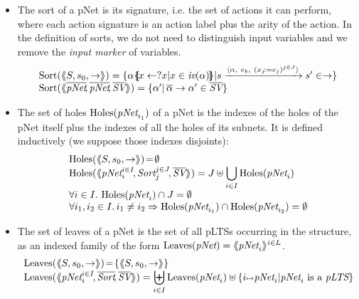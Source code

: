 \documentclass{lncs/llncs}
\begin{document}
\begin{definition}\label{def-sortholeleave}
  \begin{itemize}
  \item The sort of a pNet is its signature, i.e. the set of actions it can
perform, where each action signature is an action 
label plus the arity of the action. In the definition of sorts, we do not need to 
distinguish
input variables and we remove the
\emph{input marker} of variables.
\[
\begin{array}{l}
\Sortop(\mylangle S,s_0, \to\myrangle) = \{\alpha\subst{x \gets ?x| 
x\in\symb{iv}(\alpha)}|s \xrightarrow{\langle \alpha,~e_b,~(x_j\!:= {e}_j)^{j\in
    J}\rangle} s'\in \to \} \\
\Sortop(\mylangle \overline{\pNet}\!, %
\overline{\pNet}\!,
\overline{\symb{SV}}\myrangle)
=\{\alpha' |\, \overline{\alpha}%
\to\alpha'\in\set{\symb{SV}}\}
\end{array}
\]

\item
The set of holes $\Holes(\pNet_{i_1})$ of a pNet is the indexes of the holes of the pNet 
itself plus the indexes of all the holes of its subnets.
It is defined inductively (we suppose those indexes 
disjoints):
  \[\begin{array}{l}
\Holes(\mylangle S,s_0, \to\myrangle) \!=\! \emptyset\\
\Holes(\mylangle \pNet_i^{i\in I}\!,\Sort_j^{j\in J}\!, \overline{\symb{SV}}\myrangle) 
=J\uplus{\displaystyle \bigcup_{i\in 
I}\Holes(\pNet_i)}\\
\forall i\in I.\, \Holes(\pNet_i)\cap J=\emptyset\\
\forall i_1,i_2\in I.\,i_1\neq i_2\Rightarrow  \Holes(\pNet_{i_1})\cap\Holes(\pNet_{i_2})=\emptyset
\end{array}\]
\item
The set of leaves of a pNet is the set of all pLTSs occurring in the structure, as an 
indexed family of the form $\Leaves(\pNet)= \mylangle \pNet_i \myrangle^{i \in L}$.
\[\begin{array}{l}
\Leaves(\mylangle S,s_0, \to\myrangle) \!=\!\{\mylangle S,s_0, \to\myrangle\}\\
\Leaves(\mylangle \pNet_i^{i\in I}\!,%
\overline{\Sort}\!, \overline{\symb{SV}}\myrangle) = {\displaystyle \biguplus_{i\in 
I}\Leaves(\pNet_i)\uplus\{i\mapsto \pNet_i|\pNet_i \text{ is a }\pLTS\}}
\end{array}\]
\end{itemize}
\end{definition}
  
\end{document}
